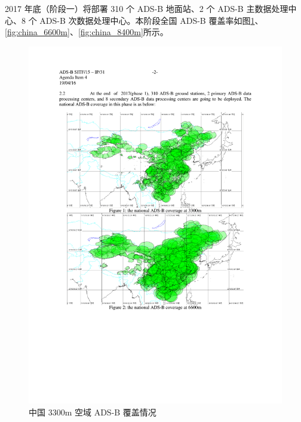 2017 年底（阶段一）将部署 310 个 ADS-B 地面站、2 个 ADS-B 主数据处理中心、8 个 ADS-B 次数据处理中心。本阶段全国 ADS-B 覆盖率如图\ref{fig:china_3300m}、\ref{fig:china_6600m}、\ref{fig:china_8400m}所示。

\begin{figure}[!htb]
\centering
\includegraphics[width=13cm]{pic/china_3300m.pdf}
\caption{中国 3300m 空域 ADS-B 覆盖情况\protect\footnotemark}
\label{fig:china_3300m}
\end{figure}


